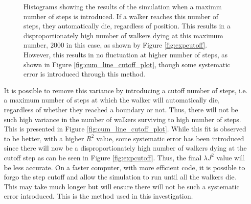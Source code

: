 \documentclass[journal]{IEEEtran}
\begin{document}
\begin{figure}[ht!]
  \centering
  \centering
  \caption{Histograms showing the results of the simulation when a maximm number
  of steps is introduced. If a walker reaches this number of steps, they
  automatically die, regardless of position. This results in a
  disproportionately high number of walkers dying at this maximum number, 2000
  in this case, as shown by Figure \ref{fig:expcutoff}. However, this results in
  no fluctuation at higher number of steps, as shown in Figure
  \ref{fig:cum_line_cutoff_plot}, though some systematic error is introduced
  through this method.}
  \label{fig:cutoffplots}
\end{figure}

It is possible to remove this variance by introducing a cutoff number of steps,
i.e. a maximum number of steps at which the walker will automatically die,
regardless of whether they reached a boundary or not. Thus, there will not be
such high variance in the number of walkers surviving to high number of
steps. This is presented in Figure \ref{fig:cum_line_cutoff_plot}. While this
fit is observed to be better, with a higher $R^2$ value, some systematic error
has been introduced since there will now be a disproportionately high number of
walkers dying at the cutoff step as can be seen in Figure
\ref{fig:expcutoff}. Thus, the final $\lambda J^2$ value will be less
accurate. On a faster computer, with more efficient code, it is possible to
forgo the step cutoff and allow the simulation to run until all the walkers
die. This may take much longer but will ensure there will not be such a
systematic error introduced. This is the method used in this investigation.
\end{document}
